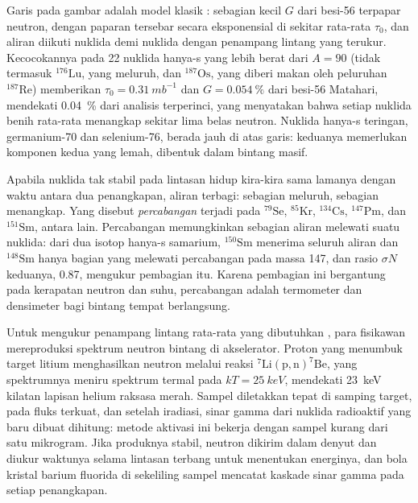 Garis pada gambar adalah model klasik : sebagian kecil $G$ dari besi-56
terpapar neutron, dengan paparan tersebar secara eksponensial di sekitar
rata-rata $\tau_0$, dan aliran diikuti nuklida demi nuklida dengan
penampang lintang yang terukur. Kecocokannya pada 22 nuklida hanya-s
yang lebih berat dari $A = 90$ (tidak termasuk $^{176}\mathrm{Lu}$, yang
meluruh, dan $^{187}\mathrm{Os}$, yang diberi makan oleh peluruhan
$^{187}\mathrm{Re}$) memberikan $\tau_0 = \qty{0.31}{mb^{-1}}$ dan
$G = \qty{0.054}{\percent}$ dari besi-56 Matahari, mendekati
\qty{0.04}{\percent} dari analisis terperinci, yang menyatakan bahwa setiap
nuklida benih rata-rata menangkap sekitar lima belas neutron. Nuklida hanya-s
teringan, germanium-70 dan selenium-76, berada jauh di atas garis: keduanya
memerlukan komponen kedua yang lemah, dibentuk dalam bintang masif.

Apabila nuklida tak stabil pada lintasan hidup kira-kira sama lamanya dengan waktu
antara dua penangkapan, aliran terbagi: sebagian meluruh, sebagian menangkap.
Yang disebut \emph{percabangan} terjadi pada $^{79}\mathrm{Se}$, $^{85}\mathrm{Kr}$,
$^{134}\mathrm{Cs}$, $^{147}\mathrm{Pm}$, dan $^{151}\mathrm{Sm}$, antara
lain. Percabangan memungkinkan sebagian aliran melewati suatu nuklida: dari dua
isotop hanya-s samarium, $^{150}\mathrm{Sm}$ menerima seluruh
aliran dan $^{148}\mathrm{Sm}$ hanya bagian yang melewati
percabangan pada massa 147, dan rasio $\sigma N$ keduanya, \num{0.87},
mengukur pembagian itu. Karena pembagian ini bergantung pada kerapatan neutron dan
suhu, percabangan adalah termometer dan densimeter bagi
bintang tempat  berlangsung.

\begin{inthelab}
Untuk mengukur penampang lintang rata-rata yang dibutuhkan ,
para fisikawan mereproduksi spektrum neutron bintang di akselerator.
Proton yang menumbuk target litium menghasilkan neutron melalui reaksi
$^{7}\mathrm{Li}(\mathrm{p},\mathrm{n})^{7}\mathrm{Be}$, yang spektrumnya
meniru spektrum termal pada $kT = \qty{25}{keV}$, mendekati
\qty{23}{keV} kilatan lapisan helium raksasa merah. Sampel diletakkan
tepat di samping target, pada fluks terkuat, dan setelah
iradiasi, sinar gamma dari nuklida radioaktif yang baru dibuat
dihitung: metode aktivasi ini bekerja dengan sampel kurang dari
satu mikrogram. Jika produknya stabil, neutron dikirim dalam denyut
dan diukur waktunya selama lintasan terbang untuk menentukan energinya, dan bola
kristal barium fluorida di sekeliling sampel mencatat
kaskade sinar gamma pada setiap penangkapan.
\end{inthelab}

